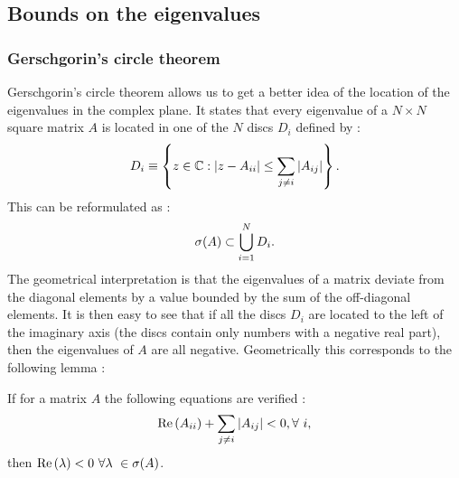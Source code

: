 \documentclass[12pt, titlepage]{report}
\begin{document}
\subsection{Bounds on the eigenvalues}
\subsubsection{Gerschgorin's circle theorem}
Gerschgorin's circle theorem \cite{gerschgorin_uber_1931} allows us to get a better idea of the location of the eigenvalues in the complex plane. It states that every eigenvalue of a $N\times N$ square matrix $A$
is located in one of the $N$ discs $D_i$ defined by :
\begin{equation}
D_i\equiv \left\{z \in \mathbb{C} : \left|{z-A_{ii}}\right| \leq \sum_{j\neq i} \left|{A_{ij}}\right| \right\}. \label{eq : definition discs Gerschgorin}
\end{equation}
This can be reformulated as :
\begin{equation}
\sigma(A) \subset \bigcup_{i=1}^N D_i. \label{eq : circle theorem}
\end{equation}
The geometrical interpretation is that the eigenvalues of a matrix deviate from the diagonal elements by a value bounded by the sum of the off-diagonal elements.
It is then easy to see that if all the discs $D_i$ are located to the left of the imaginary axis (\ie the discs contain only numbers with a negative real part), then the eigenvalues of $A$ are all negative. Geometrically this corresponds to the following lemma :
\begin{lemma}\label{lemma : lemma Gerschgorin circle}
If for a matrix $A$ the following equations are verified :
\begin{equation}
\text{Re}\left(A_{ii}\right) + \sum_{j\neq i} \left|{A_{ij}}\right| < 0, \forall \ i, \label{eq : alternative version circle theorem}
\end{equation}
then $\real{\lambda} < 0 \ \forall \lambda \in \sigma(A)$.
\end{lemma}
\end{document}
